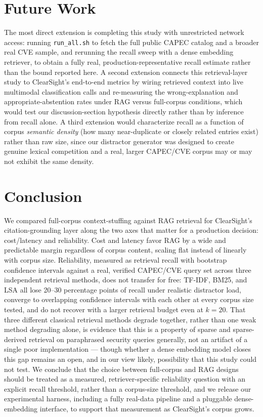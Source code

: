 \documentclass[11pt]{article}
\begin{document}
\section{Future Work}

The most direct extension is completing this study with unrestricted network access: running \texttt{run\_all.sh} to fetch the full public CAPEC catalog and a broader real CVE sample, and rerunning the recall sweep with a dense embedding retriever, to obtain a fully real, production-representative recall estimate rather than the bound reported here. A second extension connects this retrieval-layer study to ClearSight's end-to-end metrics by wiring retrieved context into live multimodal classification calls and re-measuring the wrong-explanation and appropriate-abstention rates under RAG versus full-corpus conditions, which would test our discussion-section hypothesis directly rather than by inference from recall alone. A third extension would characterize recall as a function of corpus \emph{semantic density} (how many near-duplicate or closely related entries exist) rather than raw size, since our distractor generator was designed to create genuine lexical competition and a real, larger CAPEC/CVE corpus may or may not exhibit the same density.

\section{Conclusion}

We compared full-corpus context-stuffing against RAG retrieval for ClearSight's citation-grounding layer along the two axes that matter for a production decision: cost/latency and reliability. Cost and latency favor RAG by a wide and predictable margin regardless of corpus content, scaling flat instead of linearly with corpus size. Reliability, measured as retrieval recall with bootstrap confidence intervals against a real, verified CAPEC/CVE query set across three independent retrieval methods, does not transfer for free: TF-IDF, BM25, and LSA all lose 20--30 percentage points of recall under realistic distractor load, converge to overlapping confidence intervals with each other at every corpus size tested, and do not recover with a larger retrieval budget even at $k=20$. That three different classical retrieval methods degrade together, rather than one weak method degrading alone, is evidence that this is a property of sparse and sparse-derived retrieval on paraphrased security queries generally, not an artifact of a single poor implementation --- though whether a dense embedding model closes this gap remains an open, and in our view likely, possibility that this study could not test. We conclude that the choice between full-corpus and RAG designs should be treated as a measured, retriever-specific reliability question with an explicit recall threshold, rather than a corpus-size threshold, and we release our experimental harness, including a fully real-data pipeline and a pluggable dense-embedding interface, to support that measurement as ClearSight's corpus grows.
\end{document}
